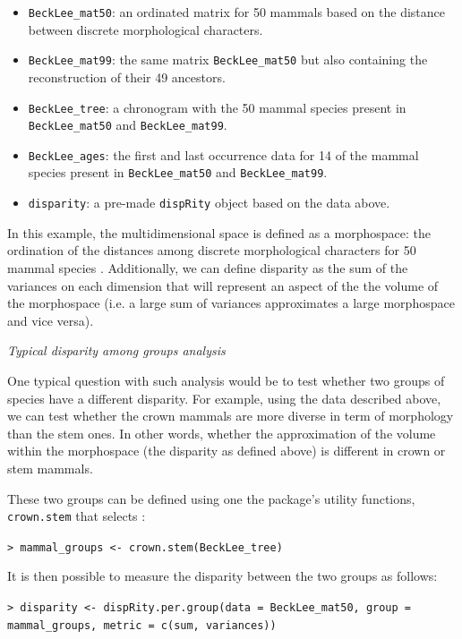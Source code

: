 \documentclass[12pt,letterpaper]{article}
\renewcommand{\subsection}[1]{%
\bigskip
\begin{center}
\begin{large}
\normalfont\itshape #1
\end{large}
\end{center}}
\newcommand{\disp}{\texttt{dispRity} }
\begin{document}
\begin{itemize}
    \item \texttt{BeckLee\_mat50}: an ordinated matrix for 50 mammals based on the distance between discrete morphological characters.
    \item \texttt{BeckLee\_mat99}: the same matrix \texttt{BeckLee\_mat50} but also containing the reconstruction of their 49 ancestors.
    \item \texttt{BeckLee\_tree}: a chronogram with the 50 mammal species present in \texttt{BeckLee\_mat50} and \texttt{BeckLee\_mat99}.
    \item \texttt{BeckLee\_ages}: the first and last occurrence data for 14 of the mammal species present in \texttt{BeckLee\_mat50} and \texttt{BeckLee\_mat99}.
    \item \texttt{disparity}: a pre-made \disp object based on the data above.
\end{itemize}

In this example, the multidimensional space is defined as a morphospace: the ordination of the distances among discrete morphological characters for 50 mammal species \citep[from][]{beckancient2014}.
Additionally, we can define disparity as the sum of the variances on each dimension \citep{foote1991morphological,Wills1994} that will represent an aspect of the the volume of the morphospace (i.e. a large sum of variances approximates a large morphospace and vice versa).

\subsection{Typical disparity among groups analysis}
One typical question with such analysis would be to test whether two groups of species have a different disparity.
For example, using the data described above, we can test whether the crown mammals are more diverse in term of morphology than the stem ones.
In other words, whether the approximation of the volume within the morphospace (the disparity as defined above) is different in crown or stem mammals.

\noindent These two groups can be defined using one the package's utility functions, \texttt{crown.stem} that selects :

\noindent \texttt{> mammal\_groups <- crown.stem(BeckLee\_tree)}

\noindent It is then possible to measure the disparity between the two groups as follows:

\noindent \texttt{> disparity <- dispRity.per.group(data = BeckLee\_mat50, group = mammal\_groups, metric = c(sum, variances))}
\end{document}
